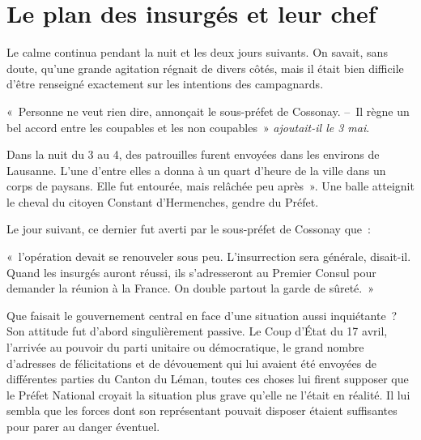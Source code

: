 \documentclass[french,twoside]{book} %
\newenvironment{quoteblock}%
  {\begin{quoting}}
  {\end{quoting}}
\newenvironment{quotebar}{%
    \def\FrameCommand{{\color{rubric!10!}\vrule width 0.5em} \hspace{0.9em}}%
    \def\OuterFrameSep{\itemsep} %
    \MakeFramed {\advance\hsize-\width \FrameRestore}
  }%
  {%
    \endMakeFramed
  }
\renewenvironment{quoteblock}%
  {%
    \savenotes
    \setstretch{0.9}
    \normalfont
    \begin{quotebar}
  }
  {%
    \end{quotebar}
    \spewnotes
  }
\begin{document}
\section[Le plan des insurgés et leur chef]{Le plan des insurgés et leur chef}
\noindent Le calme continua pendant la nuit et les deux jours suivants. On savait, sans doute, qu’une grande agitation régnait de divers côtés, mais il était bien difficile d’être renseigné exactement sur les intentions des campagnards.\par

\begin{quoteblock}
\noindent « Personne ne veut rien dire, annonçait le sous-préfet de Cossonay. – Il règne un bel accord entre les coupables et les non coupables » \emph{ajoutait-il le 3 mai}.\end{quoteblock}

\noindent Dans la nuit du 3 au 4, des patrouilles furent envoyées dans les environs de Lausanne. L’une d’entre elles a donna à un quart d’heure de la ville dans un corps de paysans. Elle fut entourée, mais relâchée peu après ». Une balle atteignit le cheval du citoyen Constant d’Hermenches, gendre du Préfet.\par
Le jour suivant, ce dernier fut averti par le sous-préfet de Cossonay que :\par

\begin{quoteblock}
\noindent « l’opération devait se renouveler sous peu. L’insurrection sera générale, disait-il. Quand les insurgés auront réussi, ils s’adresseront au Premier Consul pour demander la réunion à la France. On double partout la garde de sûreté. »\end{quoteblock}

\noindent Que faisait le gouvernement central en face d’une situation aussi inquiétante ? Son attitude fut d’abord singulièrement passive. Le Coup d’État du 17 avril, l’arrivée au pouvoir du parti unitaire ou démocratique, le grand nombre d’adresses de félicitations et de dévouement qui lui avaient été envoyées de différentes parties du Canton du Léman, toutes ces choses lui firent supposer que le Préfet National croyait la situation plus grave qu’elle ne l’était en réalité. Il lui sembla que les forces dont son représentant pouvait disposer étaient suffisantes pour parer au danger éventuel.\par
\end{document}
